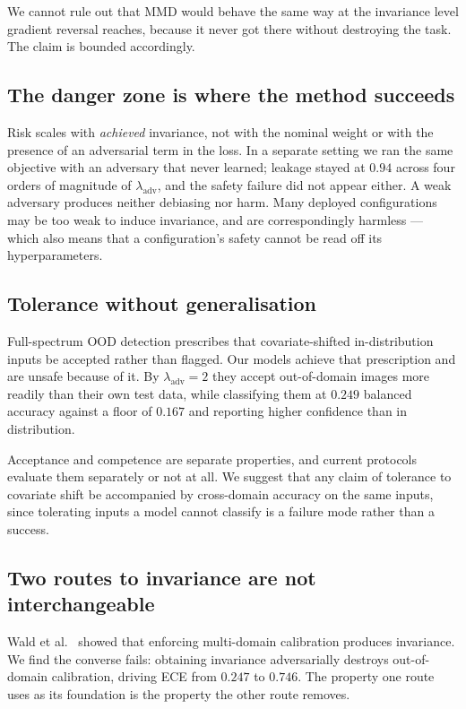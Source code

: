 \documentclass[11pt,a4paper]{article}
\newcommand{\lam}{\lambda_{\mathrm{adv}}}
\begin{document}
We cannot rule out that MMD would behave the same way at the invariance level
gradient reversal reaches, because it never got there without destroying the
task. The claim is bounded accordingly.

\subsection{The danger zone is where the method succeeds}

Risk scales with \emph{achieved} invariance, not with the nominal weight or with
the presence of an adversarial term in the loss. In a separate setting we ran
the same objective with an adversary that never learned; leakage stayed at
$0.94$ across four orders of magnitude of $\lam$, and the safety failure did not
appear either. A weak adversary produces neither debiasing nor harm. Many
deployed configurations may be too weak to induce invariance, and are
correspondingly harmless --- which also means that a configuration's safety
cannot be read off its hyperparameters.

\subsection{Tolerance without generalisation}

Full-spectrum OOD detection \cite{yang2023} prescribes that covariate-shifted
in-distribution inputs be accepted rather than flagged. Our models achieve that
prescription and are unsafe because of it. By $\lam = 2$ they accept
out-of-domain images more readily than their own test data, while classifying
them at $0.249$ balanced accuracy against a floor of $0.167$ and reporting
higher confidence than in distribution.

Acceptance and competence are separate properties, and current protocols
evaluate them separately or not at all. We suggest that any claim of tolerance
to covariate shift be accompanied by cross-domain accuracy on the same inputs,
since tolerating inputs a model cannot classify is a failure mode rather than a
success.

\subsection{Two routes to invariance are not interchangeable}

Wald et al.~\cite{wald2021} showed that enforcing multi-domain calibration
produces invariance. We find the converse fails: obtaining invariance
adversarially destroys out-of-domain calibration, driving ECE from $0.247$ to
$0.746$. The property one route uses as its foundation is the property the other
route removes.
\end{document}
